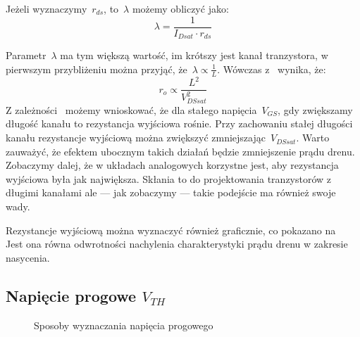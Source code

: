 \documentclass[twoside,pl,final]{labman}
\begin{document}
Jeżeli wyznaczymy~$r_{ds}$, to~$\lambda$ możemy obliczyć jako:
\begin{equation}
  \lambda = \frac{1}{I_{Dsat} \cdot r_{ds}}
  \label{eqn:ro:lambda}
\end{equation}

Parametr~$\lambda$ ma tym większą wartość, im krótszy jest kanał tranzystora,
w pierwszym przybliżeniu można przyjąć, że~$\lambda \varpropto \frac{1}{L}$.
Wówczas z~ wynika, że:
\begin{equation}
  r_o \varpropto \frac{L^2}{V_{DSsat}^2}
  \label{eqn:ro:prop}
\end{equation}
Z zależności~ możemy wnioskować,
że dla stałego napięcia~$V_{GS}$,
gdy zwiększamy długość kanału to rezystancja wyjściowa rośnie.
Przy zachowaniu stałej długości kanału rezystancje wyjściową można zwiększyć
zmniejszając~$V_{DSsat}$.
Warto zauważyć, że efektem ubocznym takich działań będzie zmniejszenie prądu drenu.
Zobaczymy dalej, że w układach analogowych korzystne jest,
aby rezystancja wyjściowa była jak największa.
Skłania to do projektowania tranzystorów z długimi kanałami
ale --- jak zobaczymy --- takie podejście ma również swoje wady.

Rezystancje wyjściową można wyznaczyć również graficznie,
co pokazano na~
Jest ona równa odwrotności nachylenia charakterystyki
prądu drenu w zakresie nasycenia.

\FloatBarrier
\subsection{Napięcie progowe $V_{TH}$}
\label{model:squarelaw:vth}

\begin{figure}[!htbp]
  \centering
  \hfill
  \caption{Sposoby wyznaczania napięcia progowego}
  \label{fig:vth}
\end{figure}
\end{document}
